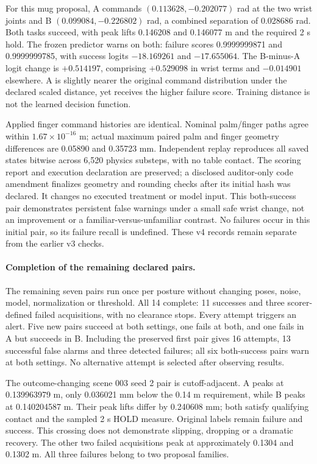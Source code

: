 \documentclass[10pt,letterpaper]{article}
\begin{document}
For this mug proposal, A commands $(0.113628,-0.202077)$ rad at the two wrist
joints and B $(0.099084,-0.226802)$ rad, a combined separation of 0.028686 rad.
Both tasks succeed, with peak lifts 0.146208 and 0.146077 m and the required
2 s hold. The frozen predictor warns on both: failure scores
0.9999999871 and 0.9999999785, with success logits $-18.169261$ and $-17.655064$.
The B-minus-A logit change is $+0.514197$, comprising $+0.529098$ in wrist terms
and $-0.014901$ elsewhere. A is slightly nearer the original command
distribution under the declared scaled distance, yet receives the higher
failure score. Training distance is not the learned decision function.

Applied finger command histories are identical. Nominal palm/finger paths
agree within $1.67\times10^{-16}$ m; actual maximum paired palm and finger
geometry differences are 0.05890 and 0.35723 mm. Independent replay reproduces
all saved states bitwise across 6,520 physics substeps, with no table contact.
The scoring report and execution declaration are preserved; a disclosed
auditor-only code amendment finalizes geometry and rounding checks after its
initial hash was declared. It changes no executed treatment or model input.
This both-success pair demonstrates persistent false warnings under a small
safe wrist change, not an improvement or a familiar-versus-unfamiliar contrast.
No failures occur in this initial pair, so its failure recall is undefined.
These v4 records remain separate from the earlier v3 checks.

\paragraph{Completion of the remaining declared pairs.}
The remaining seven pairs run once per posture without changing poses, noise,
model, normalization or threshold. All 14 complete: 11 successes and three
scorer-defined failed acquisitions, with no clearance stops. Every attempt
triggers an alert. Five new pairs succeed at both settings, one fails at both,
and one fails in A but succeeds in B. Including the preserved first pair gives
16 attempts, 13 successful false alarms and three detected failures; all six
both-success pairs warn at both settings. No alternative attempt is selected
after observing results.

The outcome-changing scene 003 seed 2 pair is cutoff-adjacent. A peaks at
0.139963979 m, only 0.036021 mm below the 0.14 m requirement, while B peaks at
0.140204587 m. Their peak lifts differ by 0.240608 mm; both satisfy qualifying
contact and the sampled 2 s HOLD measure. Original labels remain failure and
success. This crossing does not demonstrate slipping, dropping or a dramatic
recovery. The other two failed acquisitions peak at approximately 0.1304 and
0.1302 m. All three failures belong to two proposal families.
\end{document}
